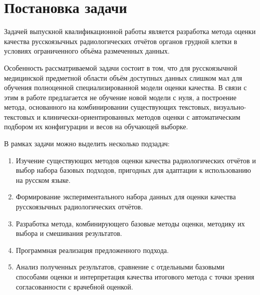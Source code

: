 
\section{Постановка задачи}



Задачей выпускной квалификационной работы является разработка метода оценки качества русскоязычных радиологических отчётов органов грудной клетки в условиях ограниченного объёма размеченных данных.

Особенность рассматриваемой задачи состоит в том, что для русскоязычной медицинской предметной области объём доступных данных слишком мал для обучения полноценной специализированной модели оценки качества. В связи с этим в работе предлагается не обучение новой модели с нуля, а построение метода, основанного на комбинировании существующих текстовых, визуально-текстовых и клинически-ориентированных методов оценки с автоматическим подбором их конфигурации и весов на обучающей выборке.

В рамках задачи можно выделить несколько подзадач:
\begin{enumerate}
    \item Изучение существующих методов оценки качества радиологических отчётов и выбор набора базовых подходов, пригодных для адаптации к использованию на русском языке.
    \item Формирование экспериментального набора данных для оценки качества русскоязычных радиологических отчётов.
    \item Разработка метода, комбинирующего базовые методы оценки, методику их выбора и смешивания результатов.
    \item Программная реализация предложенного подхода.
    \item Анализ полученных результатов, сравнение с отдельными базовыми способами оценки и интерпретация качества итогового метода с точки зрения согласованности с врачебной оценкой.
\end{enumerate}